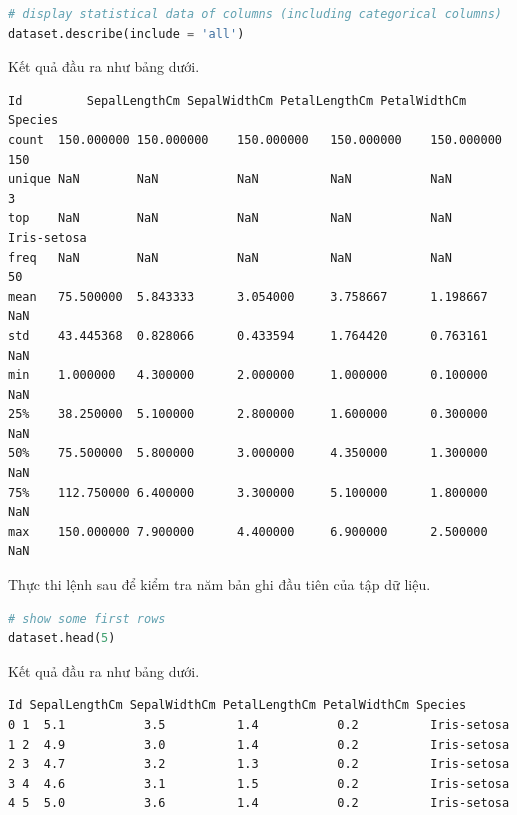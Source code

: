 \begin{center}
\begin{lstlisting}[language=Python,breaklines=true]
# display statistical data of columns (including categorical columns)
dataset.describe(include = 'all')
\end{lstlisting}
\end{center}

Kết quả đầu ra như bảng dưới.

\begin{center}
\begin{lstlisting}[basicstyle=\fontsize{8.5}{13}\selectfont\ttfamily]
       Id         SepalLengthCm SepalWidthCm PetalLengthCm PetalWidthCm Species
count  150.000000 150.000000    150.000000   150.000000    150.000000   150
unique NaN        NaN           NaN          NaN           NaN          3
top    NaN        NaN           NaN          NaN           NaN          Iris-setosa
freq   NaN        NaN           NaN          NaN           NaN          50
mean   75.500000  5.843333      3.054000     3.758667      1.198667     NaN
std    43.445368  0.828066      0.433594     1.764420      0.763161     NaN
min    1.000000   4.300000      2.000000     1.000000      0.100000     NaN
25%    38.250000  5.100000      2.800000     1.600000      0.300000     NaN
50%    75.500000  5.800000      3.000000     4.350000      1.300000     NaN
75%    112.750000 6.400000      3.300000     5.100000      1.800000     NaN
max    150.000000 7.900000      4.400000     6.900000      2.500000     NaN
\end{lstlisting}
\end{center}

Thực thi lệnh sau để kiểm tra năm bản ghi đầu tiên của tập dữ liệu.

\begin{center}
\begin{lstlisting}[language=Python,breaklines=true]
# show some first rows
dataset.head(5)
\end{lstlisting}
\end{center}

Kết quả đầu ra như bảng dưới.

\begin{center}
\begin{lstlisting}[basicstyle=\fontsize{10}{13}\selectfont\ttfamily]
  Id SepalLengthCm SepalWidthCm PetalLengthCm PetalWidthCm Species
0 1  5.1           3.5          1.4           0.2          Iris-setosa
1 2  4.9           3.0          1.4           0.2          Iris-setosa
2 3  4.7           3.2          1.3           0.2          Iris-setosa
3 4  4.6           3.1          1.5           0.2          Iris-setosa
4 5  5.0           3.6          1.4           0.2          Iris-setosa
\end{lstlisting}
\end{center}

